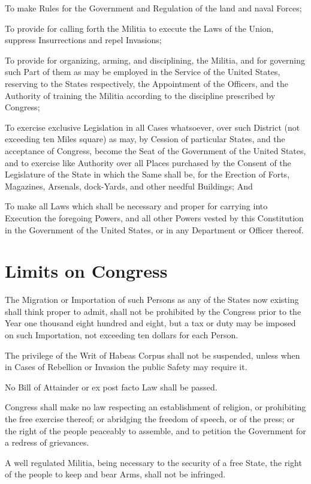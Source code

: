 \documentclass{constitution}
\begin{document}
To make Rules for the Government and Regulation of the land and naval Forces;

To provide for calling forth the Militia to execute the Laws of the Union,
suppress Insurrections and repel Invasions;

To provide for organizing, arming, and disciplining, the Militia,
and for governing such Part of them as may be employed in the Service of the United States,
reserving to the States respectively, the Appointment of the Officers,
and the Authority of training the Militia according to the discipline prescribed by Congress;

To exercise exclusive Legislation in all Cases whatsoever,
over such District (not exceeding ten Miles square) as may,
by Cession of particular States, and the acceptance of Congress,
become the Seat of the Government of the United States,
and to exercise like Authority over all Places
purchased by the Consent of the Legislature of the State in which the Same shall be,
for the Erection of Forts, Magazines, Arsenals, dock-Yards, and other needful Buildings; And

To make all Laws which shall be necessary and proper
for carrying into Execution the foregoing Powers,
and all other Powers vested by this Constitution in the Government of the United States,
or in any Department or Officer thereof.

\section{Limits on Congress}
The Migration or Importation of such Persons
as any of the States now existing shall think proper to admit,
shall not be prohibited by the Congress prior to the Year one thousand eight hundred and eight,
but a tax or duty may be imposed on such Importation,
not exceeding ten dollars for each Person.

The privilege of the Writ of Habeas Corpus shall not be suspended,
unless when in Cases of Rebellion or Invasion the public Safety may require it.

No Bill of Attainder or ex post facto Law shall be passed.

Congress shall make no law respecting an establishment of religion,
or prohibiting the free exercise thereof;
or abridging the freedom of speech, or of the press;
or the right of the people peaceably to assemble,
and to petition the Government for a redress of grievances.

A well regulated Militia, being necessary to the security of a free State,
the right of the people to keep and bear Arms, shall not be infringed.
\end{document}
